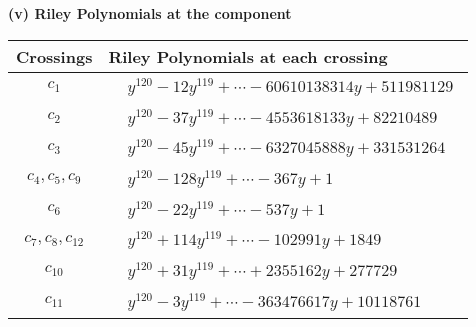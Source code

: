 \documentclass[1p]{elsarticle_modified}
\theoremstyle{definition}
\begin{document}
\newpage\renewcommand{\arraystretch}{1}
\flushleft \textbf{(v) Riley Polynomials at the component}\newline \\
\begin{tabular}{m{50pt}|m{274pt}}
Crossings & \hspace{64pt}Riley Polynomials at each crossing \\
\hline $$\begin{aligned}c_{1}\end{aligned}$$&$\begin{aligned}
&y^{120}-12 y^{119}+\cdots-60610138314 y+511981129
\end{aligned}$\\
\hline $$\begin{aligned}c_{2}\end{aligned}$$&$\begin{aligned}
&y^{120}-37 y^{119}+\cdots-4553618133 y+82210489
\end{aligned}$\\
\hline $$\begin{aligned}c_{3}\end{aligned}$$&$\begin{aligned}
&y^{120}-45 y^{119}+\cdots-6327045888 y+331531264
\end{aligned}$\\
\hline $$\begin{aligned}c_{4},c_{5},c_{9}\end{aligned}$$&$\begin{aligned}
&y^{120}-128 y^{119}+\cdots-367 y+1
\end{aligned}$\\
\hline $$\begin{aligned}c_{6}\end{aligned}$$&$\begin{aligned}
&y^{120}-22 y^{119}+\cdots-537 y+1
\end{aligned}$\\
\hline $$\begin{aligned}c_{7},c_{8},c_{12}\end{aligned}$$&$\begin{aligned}
&y^{120}+114 y^{119}+\cdots-102991 y+1849
\end{aligned}$\\
\hline $$\begin{aligned}c_{10}\end{aligned}$$&$\begin{aligned}
&y^{120}+31 y^{119}+\cdots+2355162 y+277729
\end{aligned}$\\
\hline $$\begin{aligned}c_{11}\end{aligned}$$&$\begin{aligned}
&y^{120}-3 y^{119}+\cdots-363476617 y+10118761
\end{aligned}$\\
\hline
\end{tabular}\\~\\
\end{document}
